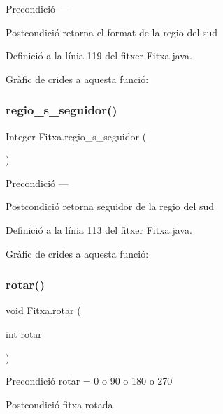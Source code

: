 \begin{DoxyPrecond}{Precondició}
--- 
\end{DoxyPrecond}
\begin{DoxyPostcond}{Postcondició}
retorna el format de la regio del sud 
\end{DoxyPostcond}


Definició a la línia 119 del fitxer Fitxa.\+java.

Gràfic de crides a aquesta funció\+:
\mbox{\label{class_fitxa_aefba843b22263005650f44992144ff53}} 
\subsubsection{\texorpdfstring{regio\+\_\+s\+\_\+seguidor()}{regio\_s\_seguidor()}}
{\footnotesize\ttfamily Integer Fitxa.\+regio\+\_\+s\+\_\+seguidor (\begin{DoxyParamCaption}{ }\end{DoxyParamCaption})}

\begin{DoxyPrecond}{Precondició}
--- 
\end{DoxyPrecond}
\begin{DoxyPostcond}{Postcondició}
retorna seguidor de la regio del sud 
\end{DoxyPostcond}


Definició a la línia 113 del fitxer Fitxa.\+java.

Gràfic de crides a aquesta funció\+:
\mbox{\label{class_fitxa_adeca1a2543f1ed0dbc74e7cc90169a35}} 
\subsubsection{\texorpdfstring{rotar()}{rotar()}}
{\footnotesize\ttfamily void Fitxa.\+rotar (\begin{DoxyParamCaption}\item[{int}]{rotar }\end{DoxyParamCaption})}

\begin{DoxyPrecond}{Precondició}
rotar = 0 o 90 o 180 o 270 
\end{DoxyPrecond}
\begin{DoxyPostcond}{Postcondició}
fitxa rotada 
\end{DoxyPostcond}



